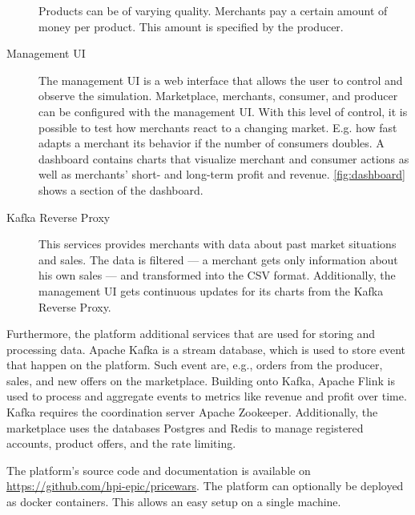 \begin{description}
		Products can be of varying quality.
		Merchants pay a certain amount of money per product.
		This amount is specified by the producer.
	\item [Management UI]
		The management UI is a web interface that allows the user to control and observe the simulation.
		Marketplace, merchants, consumer, and producer can be configured with the management UI.
		With this level of control, it is possible to test how merchants react to a changing market. E.g. how fast adapts a merchant its behavior if the number of consumers doubles.
		A dashboard contains charts that visualize merchant and consumer actions as well as merchants' short- and long-term profit and revenue.
		\cref{fig:dashboard} shows a section of the dashboard.
	\item [Kafka Reverse Proxy]
		This services provides merchants with data about past market situations and sales.
		The data is filtered --- a merchant gets only information about his own sales --- and transformed into the CSV format.
		Additionally, the management UI gets continuous updates for its charts from the Kafka Reverse Proxy.
		
\end{description}

Furthermore, the \pricewars platform additional services that are used for storing and processing data.
Apache Kafka is a stream database, which is used to store event that happen on the platform. Such event are, e.g., orders from the producer, sales, and new offers on the marketplace.
Building onto Kafka, Apache Flink is used to process and aggregate events to metrics like revenue and profit over time.
Kafka requires the coordination server Apache Zookeeper.
Additionally, the marketplace uses the databases Postgres and Redis to manage registered accounts, product offers, and the rate limiting.

The platform's source code and documentation is available on \url{https://github.com/hpi-epic/pricewars}.
The \pricewars platform can optionally be deployed as docker containers.
This allows an easy setup on a single machine.
